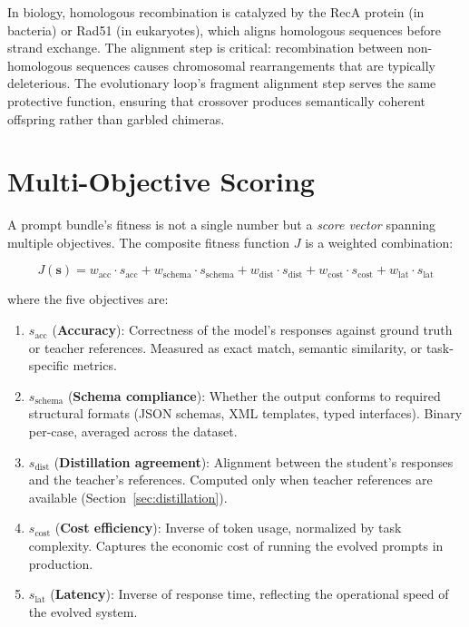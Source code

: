 \begin{bioinsight}
In biology, homologous recombination is catalyzed by the RecA protein (in bacteria) or Rad51 (in eukaryotes), which aligns homologous sequences before strand exchange. The alignment step is critical: recombination between non-homologous sequences causes chromosomal rearrangements that are typically deleterious. The evolutionary loop's fragment alignment step serves the same protective function, ensuring that crossover produces semantically coherent offspring rather than garbled chimeras.
\end{bioinsight}

\section{Multi-Objective Scoring}
\label{sec:scoring}

A prompt bundle's fitness is not a single number but a \emph{score vector} spanning multiple objectives. The composite fitness function $J$ is a weighted combination:

\begin{equation}
\boxed{
J(\mathbf{s}) = w_{\text{acc}} \cdot s_{\text{acc}} + w_{\text{schema}} \cdot s_{\text{schema}} + w_{\text{dist}} \cdot s_{\text{dist}} + w_{\text{cost}} \cdot s_{\text{cost}} + w_{\text{lat}} \cdot s_{\text{lat}}
}
\label{eq:fitness}
\end{equation}

\noindent
where the five objectives are:

\begin{enumerate}[leftmargin=1.8em]
  \item $s_{\text{acc}}$ (\textbf{Accuracy}): Correctness of the model's responses against ground truth or teacher references. Measured as exact match, semantic similarity, or task-specific metrics.

  \item $s_{\text{schema}}$ (\textbf{Schema compliance}): Whether the output conforms to required structural formats (JSON schemas, XML templates, typed interfaces). Binary per-case, averaged across the dataset.

  \item $s_{\text{dist}}$ (\textbf{Distillation agreement}): Alignment between the student's responses and the teacher's references. Computed only when teacher references are available (Section~\ref{sec:distillation}).

  \item $s_{\text{cost}}$ (\textbf{Cost efficiency}): Inverse of token usage, normalized by task complexity. Captures the economic cost of running the evolved prompts in production.

  \item $s_{\text{lat}}$ (\textbf{Latency}): Inverse of response time, reflecting the operational speed of the evolved system.
\end{enumerate}


